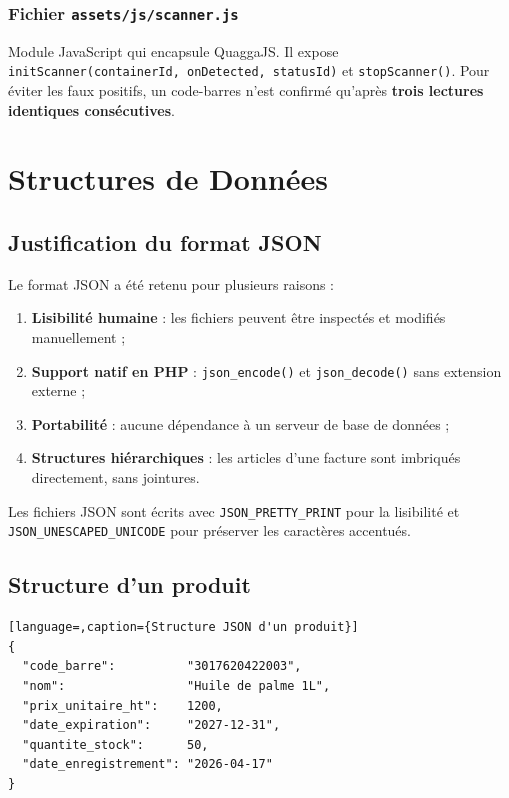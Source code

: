 \documentclass[12pt,a4paper]{report}
\begin{document}
\subsection{Fichier \texttt{assets/js/scanner.js}}
Module JavaScript qui encapsule QuaggaJS. Il expose \texttt{initScanner(containerId,
onDetected, statusId)} et \texttt{stopScanner()}. Pour éviter les faux positifs,
un code-barres n'est confirmé qu'après \textbf{trois lectures identiques consécutives}.

\chapter{Structures de Données}

\section{Justification du format JSON}

Le format JSON a été retenu pour plusieurs raisons :
\begin{enumerate}
  \item \textbf{Lisibilité humaine} : les fichiers peuvent être inspectés et modifiés manuellement ;
  \item \textbf{Support natif en PHP} : \texttt{json\_encode()} et \texttt{json\_decode()} sans extension externe ;
  \item \textbf{Portabilité} : aucune dépendance à un serveur de base de données ;
  \item \textbf{Structures hiérarchiques} : les articles d'une facture sont imbriqués directement, sans jointures.
\end{enumerate}

\begin{notebox}
  Les fichiers JSON sont écrits avec \texttt{JSON\_PRETTY\_PRINT} pour la lisibilité
  et \texttt{JSON\_UNESCAPED\_UNICODE} pour préserver les caractères accentués.
\end{notebox}

\section{Structure d'un produit}

\begin{lstlisting}[language=,caption={Structure JSON d'un produit}]
{
  "code_barre":          "3017620422003",
  "nom":                 "Huile de palme 1L",
  "prix_unitaire_ht":    1200,
  "date_expiration":     "2027-12-31",
  "quantite_stock":      50,
  "date_enregistrement": "2026-04-17"
}
\end{lstlisting}
\end{document}
